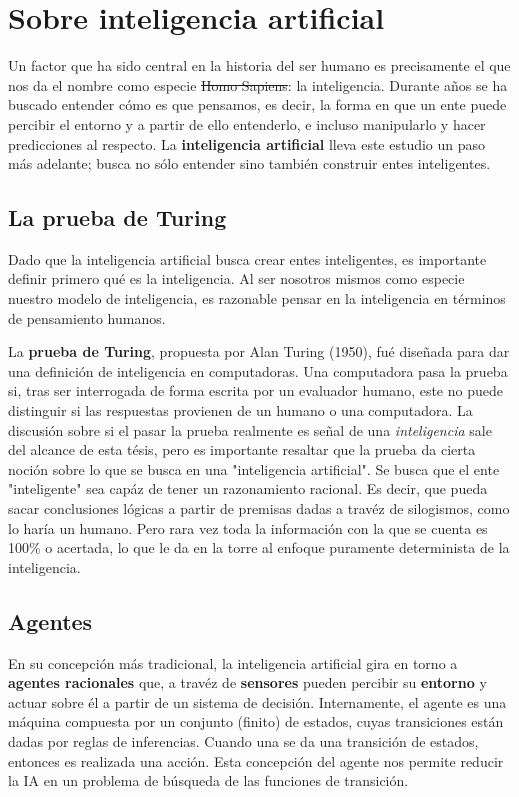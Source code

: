 \section{Sobre inteligencia artificial}
Un factor que ha sido central en la historia del ser humano es
precisamente el que nos da el nombre como especie \sout{Homo Sapiens}:
la inteligencia. Durante años se ha buscado entender cómo es que pensamos,
es decir, la forma en que un ente puede percibir el entorno y a partir
de ello entenderlo, e incluso manipularlo y hacer predicciones al respecto.
La \textbf{inteligencia artificial} lleva este estudio un paso más adelante;
busca no sólo entender sino también construir entes inteligentes.

\subsection{La prueba de Turing}
Dado que la inteligencia artificial busca crear entes inteligentes,
es importante definir primero qué es la inteligencia. Al ser nosotros
mismos como especie nuestro modelo de inteligencia, es razonable pensar
en la inteligencia en términos de pensamiento humanos.

La \textbf{prueba de Turing}, propuesta por Alan Turing (1950), fué diseñada
para dar una definición de inteligencia en computadoras. Una computadora pasa
la prueba si, tras ser interrogada de forma escrita por un evaluador humano,
este no puede distinguir si las respuestas provienen de un humano o una computadora.
La discusión sobre si el pasar la prueba realmente es señal de una \textit{inteligencia}
sale del alcance de esta tésis, pero es importante resaltar que la prueba da
cierta noción sobre lo que se busca en una "inteligencia artificial".
Se busca que el ente "inteligente" sea capáz de tener un razonamiento racional.
Es decir, que pueda sacar conclusiones lógicas a partir de premisas dadas a travéz
de silogismos, como lo haría un humano. Pero rara vez toda la información con la que
se cuenta es 100\% o acertada, lo que le da en la torre al enfoque puramente
determinista de la inteligencia. 

\subsection{Agentes}
En su concepción más tradicional, la inteligencia artificial gira en torno a
\textbf{agentes racionales} que, a travéz de \textbf{sensores} pueden percibir
su \textbf{entorno} y actuar sobre él a partir de un sistema de decisión.
Internamente, el agente es una máquina compuesta por un conjunto (finito) de estados,
cuyas transiciones están dadas por reglas de inferencias. Cuando una se da una
transición de estados, entonces es realizada una acción. Esta concepción del agente
nos permite reducir la IA en un problema de búsqueda de las funciones de transición.


